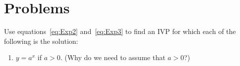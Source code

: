 \chapter{Problems}


\begin{embeddedproblem}{}
  Use equations~\ref{eq:Exp2} and~\ref{eq:Exp3} to find an IVP for
  which each of the following is the solution:
  \begin{enumerate}[label={\bf{}(\alph*)}]
  \item $y=a^x$ if $a>0$. (Why do we need to  assume that $a>0$?)
  \end{enumerate}
\end{embeddedproblem}

